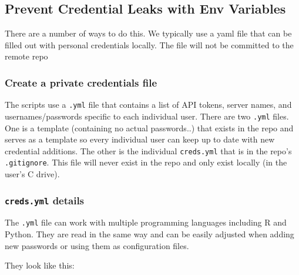\documentclass[
  letterpaper,
  DIV=11,
  numbers=noendperiod,
  oneside]{scrartcl}
\begin{document}
\subsection*{Prevent Credential Leaks with Env
Variables}\label{prevent-credential-leaks-with-env-variables}

There are a number of ways to do this. We typically use a yaml file that
can be filled out with personal credentials locally. The file will not
be committed to the remote repo

\subsubsection{Create a private credentials
file}\label{create-a-private-credentials-file}

The scripts use a \texttt{.yml} file that contains a list of API tokens,
server names, and usernames/passwords specific to each individual user.
There are two \texttt{.yml} files. One is a template (containing no
actual passwords..) that exists in the repo and serves as a template so
every individual user can keep up to date with new credential additions.
The other is the individual \texttt{creds.yml} that is in the repo's
\texttt{.gitignore}. This file will never exist in the repo and only
exist locally (in the user's C drive).

\subsubsection{\texorpdfstring{\texttt{creds.yml}
details}{creds.yml details}}\label{creds.yml-details}

The \texttt{.yml} file can work with multiple programming languages
including R and Python. They are read in the same way and can be easily
adjusted when adding new passwords or using them as configuration files.

They look like this:
\end{document}
